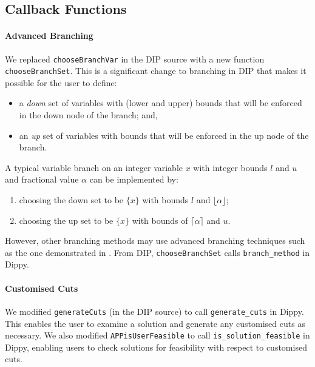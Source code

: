 \subsection{Callback Functions} \label{sbs:callbacks}

\begin{sloppypar}\paragraph{Advanced Branching}
We replaced \lstinline{chooseBranchVar} in the \ac{DIP} source with a new function \lstinline{chooseBranchSet}. 
This is a significant change to branching in DIP that makes it possible for the user to define:
\begin{itemize}
\item a {\it down} set of variables with (lower and upper) bounds that will be enforced in the down node of the branch; and,
\item an {\it up} set of variables with bounds that will be enforced in the up node of the branch.
\end{itemize}
A typical variable branch on an integer variable $x$ with integer bounds $l$ and $u$ and fractional value $\alpha$ can be implemented by:
\begin{enumerate}
\item choosing the down set to be $\{ x \}$ with bounds $l$ and $\lfloor \alpha \rfloor$;
\item choosing the up set to be $\{ x \}$ with bounds of $\lceil \alpha \rceil$ and $u$.
\end{enumerate}
However, other branching methods may use advanced branching techniques such as the one demonstrated in .
From \ac{DIP}, \lstinline{chooseBranchSet} calls \lstinline{branch_method} in Dippy.\end{sloppypar}

\begin{sloppypar}\paragraph{Customised Cuts} %
We modified \lstinline{generateCuts} (in the \ac{DIP} source) to call \lstinline{generate_cuts} in Dippy.
This enables the user to examine a solution and generate any customised cuts as necessary.
We also modified \lstinline{APPisUserFeasible} to call \lstinline{is_solution_feasible} in Dippy, enabling users to check solutions for feasibility with respect to customised cuts.\end{sloppypar}

